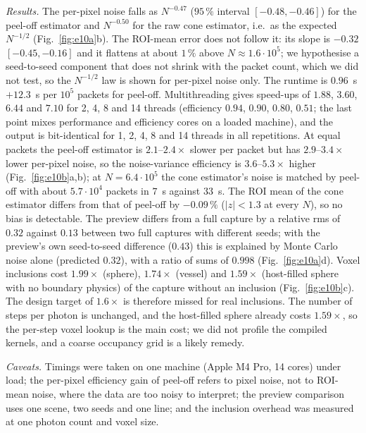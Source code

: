\documentclass[journal]{IEEEtran}
\begin{document}
\emph{Results.} The per-pixel noise falls as $N^{-0.47}$ ($95\,\%$ interval $[-0.48,-0.46]$) for the peel-off estimator and $N^{-0.50}$ for the raw cone estimator, i.e.\ as the expected $N^{-1/2}$ (Fig.~\ref{fig:e10a}b). The ROI-mean error does not follow it: its slope is $-0.32$ $[-0.45,-0.16]$ and it flattens at about $1\,\%$ above $N\approx1.6\cdot10^5$; we hypothesise a seed-to-seed component that does not shrink with the packet count, which we did not test, so the $N^{-1/2}$ law is shown for per-pixel noise only. The runtime is $0.96$~s $+12.3$~s per $10^5$ packets for peel-off. Multithreading gives speed-ups of $1.88$, $3.60$, $6.44$ and $7.10$ for 2, 4, 8 and 14 threads (efficiency $0.94$, $0.90$, $0.80$, $0.51$; the last point mixes performance and efficiency cores on a loaded machine), and the output is bit-identical for 1, 2, 4, 8 and 14 threads in all repetitions. At equal packets the peel-off estimator is $2.1$--$2.4\times$ slower per packet but has $2.9$--$3.4\times$ lower per-pixel noise, so the noise-variance efficiency is $3.6$--$5.3\times$ higher (Fig.~\ref{fig:e10b}a,b); at $N=6.4\cdot10^5$ the cone estimator's noise is matched by peel-off with about $5.7\cdot10^4$ packets in $7$~s against $33$~s. The ROI mean of the cone estimator differs from that of peel-off by $-0.09\,\%$ ($|z|<1.3$ at every $N$), so no bias is detectable. The preview differs from a full capture by a relative rms of $0.32$ against $0.13$ between two full captures with different seeds; with the preview's own seed-to-seed difference ($0.43$) this is explained by Monte Carlo noise alone (predicted $0.32$), with a ratio of sums of $0.998$ (Fig.~\ref{fig:e10a}d). Voxel inclusions cost $1.99\times$ (sphere), $1.74\times$ (vessel) and $1.59\times$ (host-filled sphere with no boundary physics) of the capture without an inclusion (Fig.~\ref{fig:e10b}c). The design target of $1.6\times$ is therefore missed for real inclusions. The number of steps per photon is unchanged, and the host-filled sphere already costs $1.59\times$, so the per-step voxel lookup is the main cost; we did not profile the compiled kernels, and a coarse occupancy grid is a likely remedy.

\emph{Caveats.} Timings were taken on one machine (Apple M4 Pro, 14 cores) under load; the per-pixel efficiency gain of peel-off refers to pixel noise, not to ROI-mean noise, where the data are too noisy to interpret; the preview comparison uses one scene, two seeds and one line; and the inclusion overhead was measured at one photon count and voxel size.
\end{document}
